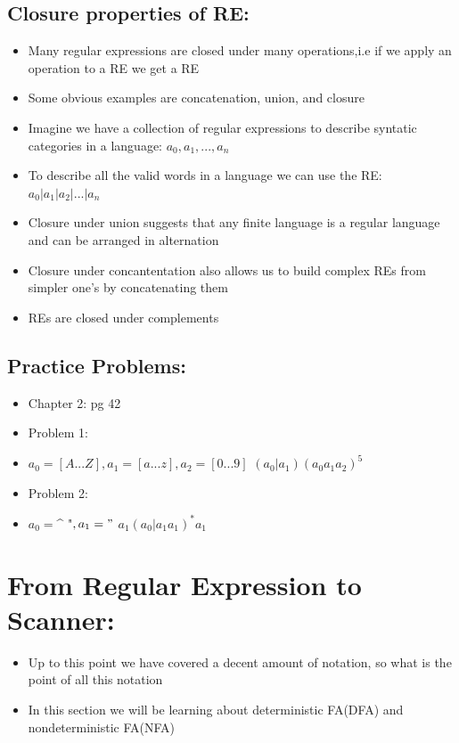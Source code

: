 \documentclass[20pt]{article}
\begin{document}
            \subsection*{Closure properties of RE:}
                    \begin{itemize}
                        \item Many regular expressions are closed under many operations,i.e if we apply an operation to a RE we get a RE
                        \item Some obvious examples are concatenation, union, and closure
                        \item Imagine we have a collection of regular expressions to describe syntatic categories in a language: $a_0, a_1,...,a_n$
                        \item To describe all the valid words in a language we can use the RE: $a_0 | a_1 | a_2|...|a_n$
                        \item Closure under union suggests that any finite language is a regular language and can be arranged in alternation
                        \item Closure under concantentation also allows us to build complex REs from simpler one's by concatenating them 
                        \item REs are closed under complements
                    \end{itemize}
            \subsection*{Practice Problems: }
                    \begin{itemize}
                        \item Chapter 2: pg 42
                        \item Problem 1:
                        \item $a_0 = [A...Z], a_1 = [a...z], a_2 = [0...9]$
                        \subitem $(a_0|a_1)(a_0a_1a_2)^5$
                        \item Problem 2:
                        \item $a_0 = $\^{} "$, a_1 = "$
                        \subitem $a_1(a_0|a_1a_1)^*a_1$
                    \end{itemize}
            \section*{From Regular Expression to Scanner:} 
                    \begin{itemize}
                        \item Up to this point we have covered a decent amount of notation, so what is the point of all this notation
                        \item In this section we will be learning about deterministic FA(DFA) and nondeterministic FA(NFA) 
                    \end{itemize}
\end{document}
